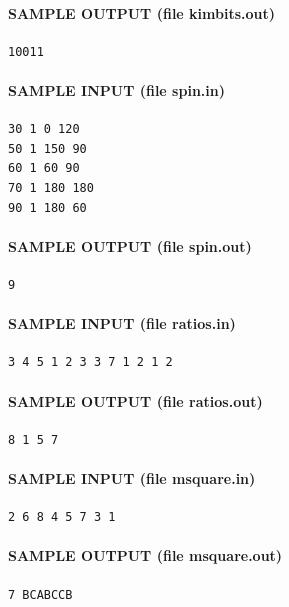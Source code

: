 \documentclass[11pt]{article}
\begin{document}
\paragraph{SAMPLE OUTPUT (file kimbits.out)}
\begin{verbatim}
10011
\end{verbatim}

\paragraph{SAMPLE INPUT (file spin.in)}
\begin{verbatim}
30 1 0 120
50 1 150 90
60 1 60 90
70 1 180 180
90 1 180 60
\end{verbatim}

\paragraph{SAMPLE OUTPUT (file spin.out)}
\begin{verbatim}
9
\end{verbatim}

\paragraph{SAMPLE INPUT (file ratios.in)}
\begin{verbatim}
3 4 5 1 2 3 3 7 1 2 1 2
\end{verbatim}

\paragraph{SAMPLE OUTPUT (file ratios.out)}
\begin{verbatim}
8 1 5 7
\end{verbatim}

\paragraph{SAMPLE INPUT (file msquare.in)}
\begin{verbatim}
2 6 8 4 5 7 3 1
\end{verbatim}

\paragraph{SAMPLE OUTPUT (file msquare.out)}
\begin{verbatim}
7 BCABCCB
\end{verbatim}
\end{document}
